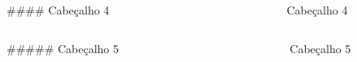 \documentclass[
]{book}
\begin{document}
\begin{columns}

\begin{column}

\#\#\#\# Cabeçalho 4

\end{column}

\begin{column}

~

\end{column}

\begin{column}

\hypertarget{cabeuxe7alho-4}{}
\begin{section}

Cabeçalho 4

\end{section}

\end{column}

\end{columns}

\begin{columns}

\begin{column}

\#\#\#\#\# Cabeçalho 5

\end{column}

\begin{column}

~

\end{column}

\begin{column}

\hypertarget{cabeuxe7alho-5}{}
\begin{section}

Cabeçalho 5

\end{section}

\end{column}

\end{columns}
\end{document}

